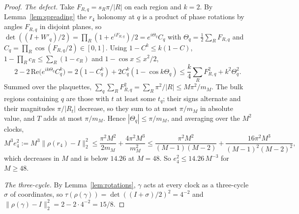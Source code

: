 \documentclass[11pt,a4paper]{article}
\theoremstyle{plain}
\theoremstyle{definition}
\theoremstyle{remark}
\begin{document}
\begin{proof}
\emph{The defect.} Take $F_{R,q}=s_R\pi/|R|$ on each region and $k=2$. By Lemma~\ref{lem:spreading} the $r_4$ holonomy at $q$ is a product
of phase rotations by angles $F_{R,q}$ in disjoint planes, so $\det((I+W'_q)/2)=\prod_R(1+e^{iF_{R,q}})/2=e^{i\Theta_q}C_q$ with
$\Theta_q=\frac12\sum_RF_{R,q}$ and $C_q=\prod_R\cos(F_{R,q}/2)\in[0,1]$. Using $1-C^k\le k(1-C)$, $1-\prod_Rc_R\le\sum_R(1-c_R)$ and
$1-\cos x\le x^2/2$,
\[
2-2\,\mathrm{Re}\big(e^{ik\Theta_q}C_q^k\big)=2(1-C_q^k)+2C_q^k(1-\cos k\Theta_q)\le\frac k4\sum_RF_{R,q}^2+k^2\Theta_q^2 .
\]
Summed over the plaquettes, $\sum_q\sum_RF_{R,q}^2=\sum_R\pi^2/|R|\le M\pi^2/m_M$. The bulk regions containing $q$ are those with $t$
at least some $t_q$; their signs alternate and their magnitudes $\pi/|R_t|$ decrease, so they sum to at most $\pi/m_M$ in absolute value,
and $T$ adds at most $\pi/m_M$. Hence $|\Theta_q|\le\pi/m_M$, and averaging over the $M^2$ clocks,
\[
M^3e_4^2:=M^3\|\rho(r_4)-I\|_2^2\le\frac{\pi^2M^2}{2m_M}+\frac{4\pi^2M^3}{m_M^2}
\le\frac{\pi^2M^2}{(M-1)(M-2)}+\frac{16\pi^2M^3}{(M-1)^2(M-2)^2},
\]
which decreases in $M$ and is below $14.26$ at $M=48$. So $e_4^2\le14.26\,M^{-3}$ for $M\ge48$.

\emph{The three-cycle.} By Lemma~\ref{lem:rotations}, $\gamma$ acts at every clock as a three-cycle $\sigma$ of coordinates, so
$\tau(\rho(\gamma))=\det((I+\sigma)/2)^2=4^{-2}$ and $\|\rho(\gamma)-I\|_2^2=2-2\cdot4^{-2}=15/8$.
\end{proof}
\end{document}
